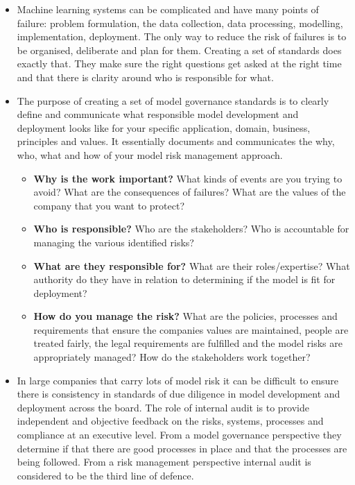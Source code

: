 \begin{itemize}[leftmargin=*]
%
\item Machine learning systems can be complicated and have many points of failure: problem formulation, the data collection, data processing, modelling, implementation, deployment. The only way to reduce the risk of failures is to be organised, deliberate and plan for them. Creating a set of standards does exactly that. They make sure the right questions get asked at the right time and that there is clarity around who is responsible for what.
%
\item The purpose of creating a set of model governance standards is to clearly define and communicate what responsible model development and deployment looks like for your specific application, domain, business, principles and values. It essentially documents and communicates the why, who, what and how of your model risk management approach.
%
\begin{itemize}[label=\hexagon]
\item \textbf{Why is the work important?} What kinds of events are you trying to avoid? What are the consequences of failures? What are the values of the company that you want to protect?
%
\item \textbf{Who is responsible?} Who are the stakeholders? Who is accountable for managing the various identified risks?
%
\item \textbf{What are they responsible for?} What are their roles/expertise? What authority do they have in relation to determining if the model is fit for deployment?
%
\item \textbf{How do you manage the risk?} What are the policies, processes and requirements that ensure the companies values are maintained, people are treated fairly, the legal requirements are fulfilled and the model risks are appropriately managed? How do the stakeholders work together?
\end{itemize}
%
\item In large companies that carry lots of model risk it can be difficult to ensure there is consistency in standards of due diligence in model development and deployment across the board. The role of internal audit is to provide independent and objective feedback on the risks, systems, processes and compliance at an executive level. From a model governance perspective they determine if that there are good processes in place and that the processes are being followed. From a risk management perspective  internal audit is considered to be the third line of defence.
%
\end{itemize}

